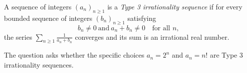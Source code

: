 \begin{definition}
A sequence of integers $(a_n)_{n\ge 1}$ is a \emph{Type 3 irrationality sequence} if for every bounded sequence of integers $(b_n)_{n\ge 1}$ satisfying
\[
 b_n \neq 0 \ \text{and}\ a_n+b_n\neq 0 \quad\text{for all }n,
\]
the series $\sum_{n\ge 1} \frac{1}{a_n+b_n}$ converges and its sum is an irrational real number.
\end{definition}

The question asks whether the specific choices $a_n=2^n$ and $a_n=n!$ are Type 3 irrationality sequences.
